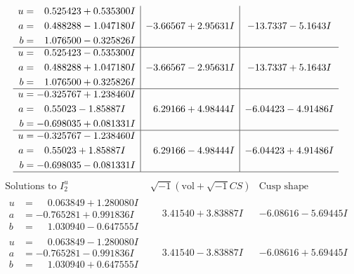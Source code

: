 \documentclass[1p]{elsarticle_modified}
\theoremstyle{definition}
\newcommand{\I}{\sqrt{-1}}
\begin{document}
$$\begin{array}{c|c|c}
\begin{aligned}
u &= \phantom{-}0.525423 + 0.535300 I \\
a &= \phantom{-}0.488288 - 1.047180 I \\
b &= \phantom{-}1.076500 - 0.325826 I\end{aligned}
 & -3.66567 + 2.95631 I & -13.7337 - 5.1643 I \\ \hline\begin{aligned}
u &= \phantom{-}0.525423 - 0.535300 I \\
a &= \phantom{-}0.488288 + 1.047180 I \\
b &= \phantom{-}1.076500 + 0.325826 I\end{aligned}
 & -3.66567 - 2.95631 I & -13.7337 + 5.1643 I \\ \hline\begin{aligned}
u &= -0.325767 + 1.238460 I \\
a &= \phantom{-}0.55023 - 1.85887 I \\
b &= -0.698035 + 0.081331 I\end{aligned}
 & \phantom{-}6.29166 + 4.98444 I & -6.04423 - 4.91486 I \\ \hline\begin{aligned}
u &= -0.325767 - 1.238460 I \\
a &= \phantom{-}0.55023 + 1.85887 I \\
b &= -0.698035 - 0.081331 I\end{aligned}
 & \phantom{-}6.29166 - 4.98444 I & -6.04423 + 4.91486 I\\
 \hline 
 \end{array}$$\newpage$$\begin{array}{c|c|c}  
\text{Solutions to }I^u_{2}& \I (\text{vol} + \sqrt{-1}CS) & \text{Cusp shape}\\
 \hline 
\begin{aligned}
u &= \phantom{-}0.063849 + 1.280080 I \\
a &= -0.765281 + 0.991836 I \\
b &= \phantom{-}1.030940 - 0.647555 I\end{aligned}
 & \phantom{-}3.41540 + 3.83887 I & -6.08616 - 5.69445 I \\ \hline\begin{aligned}
u &= \phantom{-}0.063849 - 1.280080 I \\
a &= -0.765281 - 0.991836 I \\
b &= \phantom{-}1.030940 + 0.647555 I\end{aligned}
 & \phantom{-}3.41540 - 3.83887 I & -6.08616 + 5.69445 I \\ \hline\begin{aligned}

\end{aligned}
\end{array}$$
\end{document}

